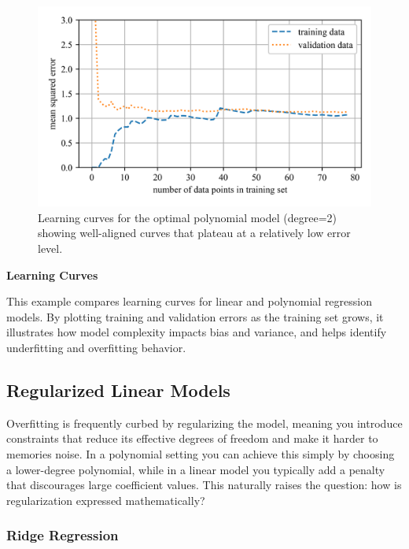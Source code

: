 \documentclass[12pt,letter]{article}
\begin{document}
\begin{figure}[H]
    \centering
    \includegraphics[]{../figures/overfitting_4.png}
    \caption{Learning curves for the optimal polynomial model (degree=2) showing well-aligned curves that plateau at a relatively low error level.}
    \label{fig:overfitting_4}
\end{figure}



\begin{example}
\textbf{Learning Curves}

\noindent This example compares learning curves for linear and polynomial regression models. By plotting training and validation errors as the training set grows, it illustrates how model complexity impacts bias and variance, and helps identify underfitting and overfitting behavior.
\end{example}




\subsection{Regularized Linear Models}
Overfitting is frequently curbed by regularizing the model, meaning you introduce constraints that reduce its effective degrees of freedom and make it harder to memories noise. In a polynomial setting you can achieve this simply by choosing a lower-degree polynomial, while in a linear model you typically add a penalty that discourages large coefficient values. This naturally raises the question: how is regularization expressed mathematically?


\subsubsection{Ridge Regression}
\end{document}
